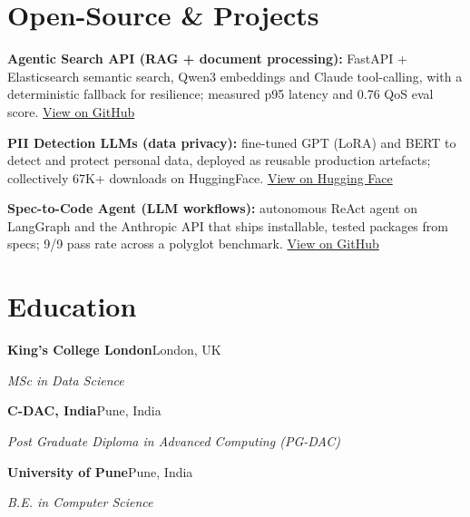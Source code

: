 \documentclass[10pt,a4paper]{article}
\begin{document}
\section{Open-Source \& Projects}
\begin{tight}
  \item \textbf{Agentic Search API (RAG + document processing):} FastAPI + Elasticsearch semantic search, Qwen3 embeddings and Claude tool-calling, with a deterministic fallback for resilience; measured p95 latency and 0.76 QoS eval score. \href{https://github.com/abhijeetscode/search-agent}{View on GitHub}
  \item \textbf{PII Detection LLMs (data privacy):} fine-tuned GPT (LoRA) and BERT to detect and protect personal data, deployed as reusable production artefacts; collectively 67K+ downloads on HuggingFace. \href{https://huggingface.co/ab-ai/pii_model}{View on Hugging Face}
  \item \textbf{Spec-to-Code Agent (LLM workflows):} autonomous ReAct agent on LangGraph and the Anthropic API that ships installable, tested packages from specs; 9/9 pass rate across a polyglot benchmark. \href{https://github.com/abhijeetscode/Spec-to-Code-Agent}{View on GitHub}
\end{tight}

\section{Education}
{\color{company}\bfseries King's College London}\hfill {\color{muted}London, UK}\par
{\itshape MSc in Data Science}\par\vspace{2pt}
{\color{company}\bfseries C-DAC, India}\hfill {\color{muted}Pune, India}\par
{\itshape Post Graduate Diploma in Advanced Computing (PG-DAC)}\par\vspace{2pt}
{\color{company}\bfseries University of Pune}\hfill {\color{muted}Pune, India}\par
{\itshape B.E. in Computer Science}\par
\end{document}
